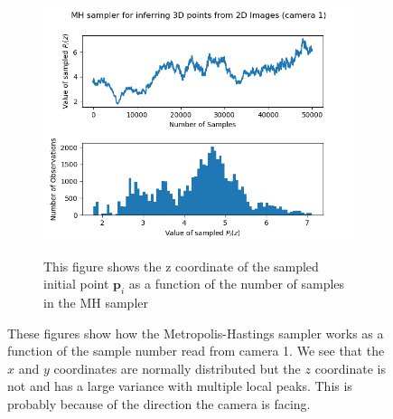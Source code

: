 \documentclass[10pt]{article}
\begin{document}
\begin{enumerate}
\begin{figure}[h!]
\begin{subfigure}[]{.320\textwidth}
\end{subfigure}
\begin{subfigure}[]{.320\textwidth}
  \centering
  \includegraphics[width=1\linewidth]{figures/p_i_z.png}
  \label{fig:t2pif}
\caption{This figure shows the z coordinate of the sampled initial point $\mathbf{p}_i$ as a function of the number of samples in the MH sampler}\end{subfigure}
\caption{These figures show how the Metropolis-Hastings sampler works as a function of the sample number read from camera 1. We see that the $x$ and $y$ coordinates are normally distributed but the $z$ coordinate is not and has a large variance with multiple local peaks. This is probably because of the direction  the camera is facing.}

\end{figure}



\end{enumerate}
\end{document}
